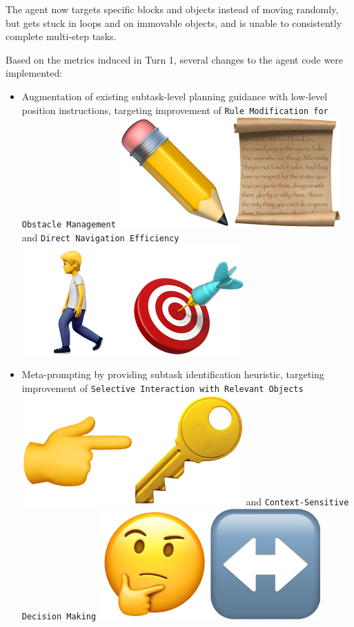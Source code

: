 The agent now targets specific blocks and objects instead of moving randomly, but gets stuck in loops and on immovable objects, and is unable to consistently complete multi-step tasks.

Based on the metrics induced in Turn 1, several changes to the agent code were implemented:
\begin{itemize}
    \item Augmentation of existing subtask-level planning guidance with low-level position instructions, targeting improvement of \texttt{Rule Modification for Obstacle Management} \includegraphics[scale=0.07]{figs/emojis/emoji_2.png} and \texttt{Direct Navigation Efficiency} \includegraphics[scale=0.07]{figs/emojis/emoji_3.png}
    \item Meta-prompting \cite{Suzgun_Kalai_2024} by providing subtask identification heuristic, targeting improvement of \texttt{Selective Interaction with Relevant Objects} \includegraphics[scale=0.07]{figs/emojis/emoji_6.png} and \texttt{Context-Sensitive Decision Making} \includegraphics[scale=0.07]{figs/emojis/emoji_4.png}

\end{itemize}

